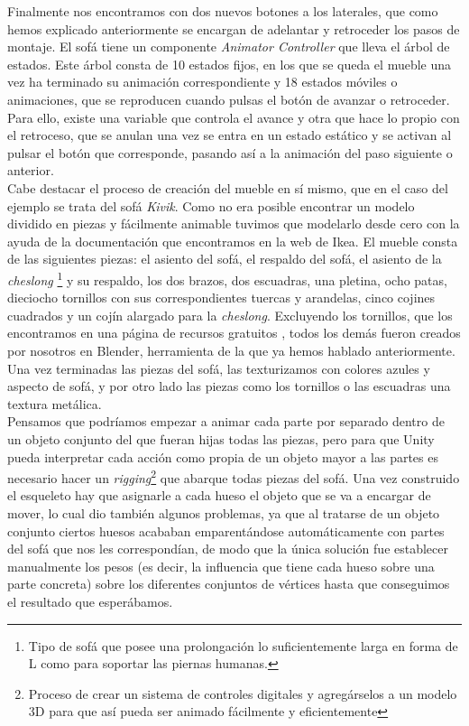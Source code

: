 Finalmente nos encontramos con dos nuevos botones a los laterales, que como hemos explicado anteriormente se encargan de adelantar y retroceder los pasos de montaje. El sofá tiene un componente \textit{Animator Controller} que lleva el árbol de estados. Este árbol consta de 10 estados fijos, en los que se queda el mueble una vez ha terminado su animación correspondiente y 18 estados móviles o animaciones, que se reproducen cuando pulsas el botón de avanzar o retroceder. Para ello, existe una variable que controla el avance y otra que hace lo propio con el retroceso, que se anulan una vez se entra en un estado estático y se activan al pulsar el botón que corresponde, pasando así a la animación del paso siguiente o anterior.\\

Cabe destacar el proceso de creación del mueble en sí mismo, que en el caso del ejemplo se trata del sofá \textit{Kivik}. Como no era posible encontrar un modelo dividido en piezas y fácilmente animable tuvimos que modelarlo desde cero con la ayuda de la documentación que encontramos en la web de Ikea. El mueble consta de las siguientes piezas: el asiento del sofá, el respaldo del sofá, el asiento de la \textit{cheslong} \footnote{ Tipo de sofá que posee una prolongación lo suficientemente larga en forma de L como para soportar las piernas humanas.} y su respaldo, los dos brazos, dos escuadras, una pletina, ocho patas, dieciocho tornillos con sus correspondientes tuercas y arandelas, cinco cojines cuadrados y un cojín alargado para la \textit{cheslong}. Excluyendo los tornillos, que los encontramos en una página de recursos gratuitos \cite{tornillos}, todos los demás fueron creados por nosotros en Blender, herramienta de la que ya hemos hablado anteriormente. Una vez terminadas las piezas del sofá, las texturizamos con colores azules y aspecto de sofá, y por otro lado las piezas como los tornillos o las escuadras una textura metálica.\\

Pensamos que podríamos empezar a animar cada parte por separado dentro de un objeto conjunto del que fueran hijas todas las piezas, pero para que Unity pueda interpretar cada acción como propia de un objeto mayor a las partes es necesario hacer un \textit{rigging}\footnote{ Proceso de crear un sistema de controles digitales y agregárselos a un modelo 3D para que así pueda ser animado fácilmente y eficientemente} que abarque todas piezas del sofá. Una vez construido el esqueleto hay que asignarle a cada hueso el objeto que se va a encargar de mover, lo cual dio también algunos problemas, ya que al tratarse de un objeto conjunto ciertos huesos acababan emparentándose automáticamente con partes del sofá que nos les correspondían, de modo que la única solución fue establecer manualmente los pesos (es decir, la influencia que tiene cada hueso sobre una parte concreta) sobre los diferentes conjuntos de vértices hasta que conseguimos el resultado que esperábamos.\\

